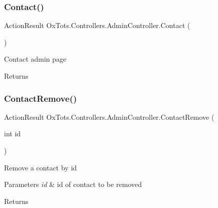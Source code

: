 \subsubsection{\texorpdfstring{Contact()}{Contact()}}
{\footnotesize\ttfamily Action\+Result Ox\+Tots.\+Controllers.\+Admin\+Controller.\+Contact (\begin{DoxyParamCaption}{ }\end{DoxyParamCaption})\hspace{0.3cm}{\ttfamily [inline]}}



Contact admin page 

\begin{DoxyReturn}{Returns}

\end{DoxyReturn}
\mbox{\label{class_ox_tots_1_1_controllers_1_1_admin_controller_ad74cf7ee9d9408aaaf2ea22f1e843b75}} 
\subsubsection{\texorpdfstring{ContactRemove()}{ContactRemove()}}
{\footnotesize\ttfamily Action\+Result Ox\+Tots.\+Controllers.\+Admin\+Controller.\+Contact\+Remove (\begin{DoxyParamCaption}\item[{int}]{id }\end{DoxyParamCaption})\hspace{0.3cm}{\ttfamily [inline]}}



Remove a contact by id 


\begin{DoxyParams}{Parameters}
{\em id} & id of contact to be removed\\
\hline
\end{DoxyParams}
\begin{DoxyReturn}{Returns}

\end{DoxyReturn}
\mbox{\label{class_ox_tots_1_1_controllers_1_1_admin_controller_ad24e4fde877f19b3bea0ec8bc25c7b43}} 
